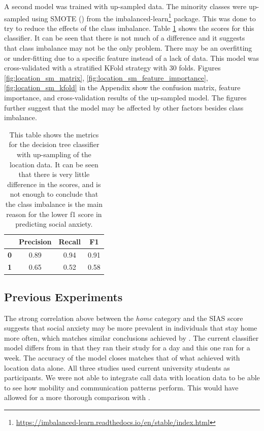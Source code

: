 \documentclass{l4proj}
\begin{document}
A second model was trained with up-sampled data. The minority classes were up-sampled using SMOTE (\cite{smote}) from the imbalanced-learn\footnote{\url{https://imbalanced-learn.readthedocs.io/en/stable/index.html}} package. This was done to try to reduce the effects of the class imbalance. Table \ref{table:location_sm_metrics} shows the scores for this classifier. It can be seen that there is not much of a difference and it suggests that class imbalance may not be the only problem. There may be an overfitting or under-fitting due to a specific feature instead of a lack of data. This model was cross-validated with a stratified KFold strategy with 30 folds. Figures \ref{fig:location_sm_matrix}, \ref{fig:location_sm_feature_importance}, \ref{fig:location_sm_kfold} in the Appendix show the confusion matrix, feature importance, and cross-validation results of the up-sampled model. The figures further suggest that the model may be affected by other factors besides class imbalance.

\begin{table}[htb]
\centering
\begin{tabular}{@{}cccc@{}}
 & \textbf{Precision} & \textbf{Recall} & \textbf{F1} \\ \midrule
\textbf{0} & 0.89 & 0.94 & 0.91 \\
\textbf{1} & 0.65 & 0.52 & 0.58
\end{tabular}
\caption{This table shows the metrics for the decision tree classifier with up-sampling of the location data. It can be seen that there is very little difference in the scores, and is not enough to conclude that the class imbalance is the main reason for the lower f1 score in predicting social anxiety.}
\label{table:location_sm_metrics}
\end{table}

\subsection{Previous Experiments}
The strong correlation above between the \textit{home} category and the SIAS score suggests that social anxiety may be more prevalent in individuals that stay home more often, which matches similar conclusions achieved by \cite{wood, mobile_sensing_for_depression_social_anxiety, boukhechba}. The current classifier model differs from \cite{wood} in that they ran their study for a day and this one ran for a week. The accuracy of the model closes matches that of what \cite{boukhechba} achieved with location data alone. All three studies used current university students as participants. We were not able to integrate call data with location data to be able to see how mobility and communication patterns perform. This would have allowed for a more thorough comparison with \cite{boukhechba}.
\end{document}

